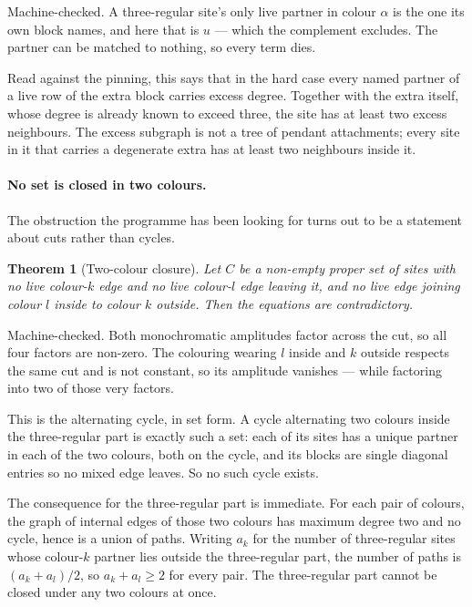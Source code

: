 \documentclass[11pt]{article}
\newtheorem{theorem}{Theorem}[section]
\theoremstyle{definition}
\theoremstyle{remark}
\begin{document}
Machine-checked. A three-regular site's only live partner in colour $\alpha$ is the one its
own block names, and here that is $u$ --- which the complement excludes. The partner can be
matched to nothing, so every term dies.

Read against the pinning, this says that in the hard case every named partner of a live row
of the extra block carries excess degree. Together with the extra itself, whose degree is
already known to exceed three, the site has at least two excess neighbours. The excess
subgraph is not a tree of pendant attachments; every site in it that carries a degenerate
extra has at least two neighbours inside it.

\paragraph{No set is closed in two colours.} The obstruction the programme has been looking
for turns out to be a statement about cuts rather than cycles.

\begin{theorem}[Two-colour closure]\label{thm:twocolour}
Let $C$ be a non-empty proper set of sites with no live colour-$k$ edge and no live
colour-$l$ edge leaving it, and no live edge joining colour $l$ inside to colour $k$ outside.
Then the equations are contradictory.
\end{theorem}

Machine-checked. Both monochromatic amplitudes factor across the cut, so all four factors are
non-zero. The colouring wearing $l$ inside and $k$ outside respects the same cut and is not
constant, so its amplitude vanishes --- while factoring into two of those very factors.

This is the alternating cycle, in set form. A cycle alternating two colours inside the
three-regular part is exactly such a set: each of its sites has a unique partner in each of
the two colours, both on the cycle, and its blocks are single diagonal entries so no mixed
edge leaves. So no such cycle exists.

The consequence for the three-regular part is immediate. For each pair of colours, the graph
of internal edges of those two colours has maximum degree two and no cycle, hence is a union
of paths. Writing $a_k$ for the number of three-regular sites whose colour-$k$ partner lies
outside the three-regular part, the number of paths is $(a_k+a_l)/2$, so $a_k + a_l \geq 2$
for every pair. The three-regular part cannot be closed under any two colours at once.
\end{document}

